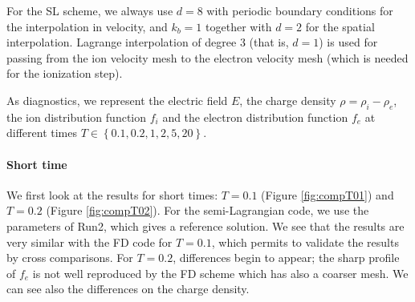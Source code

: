 \documentclass{article}
\numberwithin{equation}{section}
\begin{document}



For the SL scheme, we always use $d=8$ with periodic boundary conditions for the interpolation in velocity, and $k_b=1$ together with $d=2$ for the spatial interpolation.
Lagrange interpolation of degree $3$  (that is, $d=1$) is used for passing from the ion velocity mesh to the electron velocity mesh (which is needed for the ionization step).

As diagnostics, we represent the electric field $E$, the charge density $\rho=\rho_i-\rho_e$, the ion distribution function $f_i$ and the electron distribution function $f_e$ at different times $T\in \left\{0.1,0.2,1,2,5,20\right\}$.

\paragraph{Short time}

We first look at the results for short times: $T=0.1$ (Figure \ref{fig:compT01}) and $T=0.2$ (Figure \ref{fig:compT02}). For the semi-Lagrangian code, we use the parameters of Run2, which gives a reference solution.
We see that the results are very similar with the FD code for $T=0.1$, which permits to validate the results by cross comparisons. For $T=0.2$, differences begin to appear; the sharp profile of $f_e$ is not well
reproduced by the FD scheme which has also a coarser mesh. We can see also the differences on the charge density.

\end{document}
